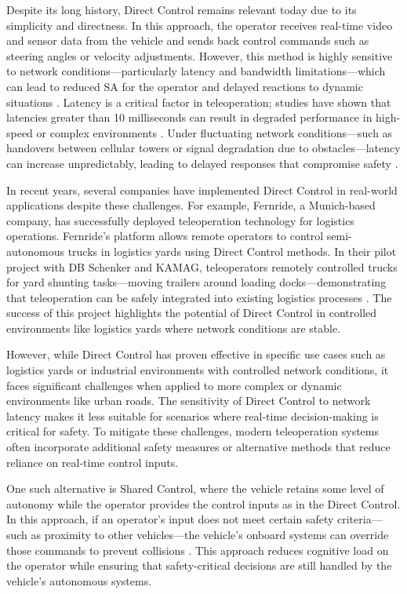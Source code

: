 Despite its long history, Direct Control remains relevant
today due to its simplicity and directness. In this approach,
the operator receives real-time video and sensor data from the
vehicle and sends back control commands such as steering angles
or velocity adjustments. However, this method is highly sensitive
to network conditions—particularly latency and bandwidth
limitations—which can lead to reduced \ac{SA} for
the operator and delayed reactions to dynamic situations \cite{Gnatzig}.
Latency is a critical factor in teleoperation; studies have shown
that latencies greater than 10 milliseconds can result in degraded
performance in high-speed or complex environments \cite{chucholowski2014teleoperated}.
Under fluctuating network conditions—such as handovers
between cellular towers or signal degradation due to obstacles—latency
can increase unpredictably, leading to delayed responses that
compromise safety \cite{neumeier2023feasibility}.

In recent years, several companies have implemented Direct Control
in real-world applications despite these challenges. For example,
Fernride, a Munich-based company, has successfully deployed
teleoperation technology for logistics operations. Fernride's
platform allows remote operators to control semi-autonomous
trucks in logistics yards using Direct Control methods.
In their pilot project with DB Schenker and KAMAG,
teleoperators remotely controlled trucks for yard shunting
tasks—moving trailers around loading docks—demonstrating that
teleoperation can be safely integrated into existing logistics
processes \cite{fernride2023}. The success of this project
highlights the potential of Direct Control in controlled
environments like logistics yards where network conditions are stable.

However, while Direct Control has proven effective in specific use cases
such as logistics yards or industrial environments with
controlled network conditions, it faces significant challenges when
applied to more complex or dynamic environments like urban roads.
The sensitivity of Direct Control to network latency makes it less
suitable for scenarios where real-time decision-making is critical for
safety. To mitigate these challenges, modern teleoperation systems
often incorporate additional safety measures or alternative methods
that reduce reliance on real-time control inputs.

One such alternative is Shared Control, where the vehicle retains
some level of autonomy while the operator provides the control inputs as in the Direct Control.
In this approach, if an operator's input does not meet
certain safety criteria—such as proximity to other vehicles—the
vehicle's onboard systems can override those commands to prevent
collisions \cite{kay2024sharedcontrol}. This approach reduces
cognitive load on the operator while ensuring that safety-critical
decisions are still handled by the vehicle's autonomous systems.


